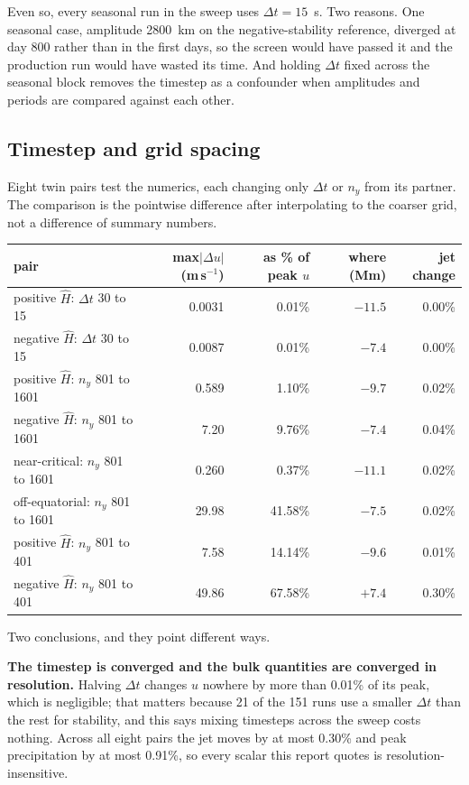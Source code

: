 \documentclass[11pt]{article}
\newcommand{\Hhat}{\hat{H}}
\newcommand{\ms}{m\,s$^{-1}$}
\begin{document}
Even so, every seasonal run in the sweep uses $\Delta t = 15$~s. Two reasons.
One seasonal case, amplitude 2800~km on the negative-stability reference,
diverged at day 800 rather than in the first days, so the screen would have
passed it and the production run would have wasted its time. And holding
$\Delta t$ fixed across the seasonal block removes the timestep as a confounder
when amplitudes and periods are compared against each other.

\subsection{Timestep and grid spacing}

Eight twin pairs test the numerics, each changing only $\Delta t$ or $n_y$ from
its partner. The comparison is the pointwise difference after interpolating to
the coarser grid, not a difference of summary numbers.

\begin{center}
\small
\begin{tabular}{lrrrr}
\toprule
pair & max$|\Delta u|$ (\ms) & as \% of peak $u$ & where (Mm) & jet change\\
\midrule
positive $\Hhat$: $\Delta t$ 30 to 15 & 0.0031 & 0.01\% & $-11.5$ & 0.00\%\\
negative $\Hhat$: $\Delta t$ 30 to 15 & 0.0087 & 0.01\% & $-7.4$  & 0.00\%\\
positive $\Hhat$: $n_y$ 801 to 1601   & 0.589  & 1.10\% & $-9.7$  & 0.02\%\\
negative $\Hhat$: $n_y$ 801 to 1601   & 7.20   & 9.76\% & $-7.4$  & 0.04\%\\
near-critical: $n_y$ 801 to 1601      & 0.260  & 0.37\% & $-11.1$ & 0.02\%\\
off-equatorial: $n_y$ 801 to 1601     & 29.98  & 41.58\%& $-7.5$  & 0.02\%\\
positive $\Hhat$: $n_y$ 801 to 401    & 7.58   & 14.14\%& $-9.6$  & 0.01\%\\
negative $\Hhat$: $n_y$ 801 to 401    & 49.86  & 67.58\%& $+7.4$  & 0.30\%\\
\bottomrule
\end{tabular}
\end{center}

Two conclusions, and they point different ways.

\textbf{The timestep is converged and the bulk quantities are converged in
resolution.} Halving $\Delta t$ changes $u$ nowhere by more than 0.01\% of its
peak, which is negligible; that matters because 21 of the 151 runs use a smaller
$\Delta t$ than the rest for stability, and this says mixing timesteps across the
sweep costs nothing. Across all eight pairs the jet moves by at most 0.30\% and
peak precipitation by at most 0.91\%, so every scalar this report quotes is
resolution-insensitive.
\end{document}
